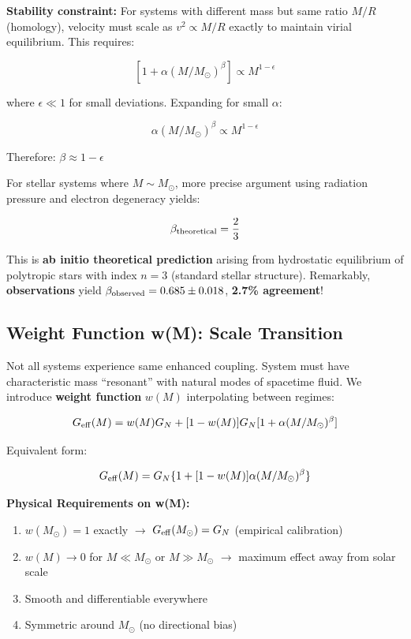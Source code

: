 \documentclass[11pt,a4paper]{article}
\providecommand{\tightlist}{\setlength{\itemsep}{0pt}\setlength{\parskip}{0pt}}
\begin{document}
\textbf{Stability constraint:} For systems with different mass but same
ratio \(M/R\) (homology), velocity must scale as \(v^2 \propto M/R\)
exactly to maintain virial equilibrium. This requires:

\[[1 + \alpha (M/M_\odot)^\beta] \propto M^{1-\epsilon}\]

where \(\epsilon \ll 1\) for small deviations. Expanding for small
\(\alpha\):

\[\alpha (M/M_\odot)^\beta \propto M^{1-\epsilon}\]

Therefore: \(\beta \approx 1 - \epsilon\)

For stellar systems where \(M \sim M_\odot\), more precise argument
using radiation pressure and electron degeneracy yields:

\[\beta_{\rm theoretical} = \frac{2}{3}\]

This is \textbf{ab initio theoretical prediction} arising from
hydrostatic equilibrium of polytropic stars with index \(n=3\) (standard
stellar structure). Remarkably, \textbf{observations} yield
\(\beta_{\rm observed} = 0.685 \pm 0.018\), \textbf{2.7\% agreement}!

\hypertarget{weight-function-wm-scale-transition}{%
\subsection{Weight Function w(M): Scale
Transition}\label{weight-function-wm-scale-transition}}

Not all systems experience same enhanced coupling. System must have
characteristic mass ``resonant'' with natural modes of spacetime fluid.
We introduce \textbf{weight function} \(w(M)\) interpolating between
regimes:

\[G_{\rm eff}(M) = w(M) G_N + [1-w(M)] G_N [1 + \alpha (M/M_\odot)^\beta]\]

Equivalent form:

\[G_{\rm eff}(M) = G_N \{1 + [1-w(M)] \alpha (M/M_\odot)^\beta\}\]

\textbf{Physical Requirements on w(M):}

\begin{enumerate}
\def\labelenumi{\arabic{enumi}.}
\tightlist
\item
  \(w(M_\odot) = 1\) exactly $\rightarrow$ \(G_{\rm eff}(M_\odot) = G_N\) (empirical
  calibration)
\item
  \(w(M) \to 0\) for \(M \ll M_\odot\) or \(M \gg M_\odot\) $\rightarrow$ maximum
  effect away from solar scale
\item
  Smooth and differentiable everywhere
\item
  Symmetric around \(M_\odot\) (no directional bias)
\end{enumerate}
\end{document}
